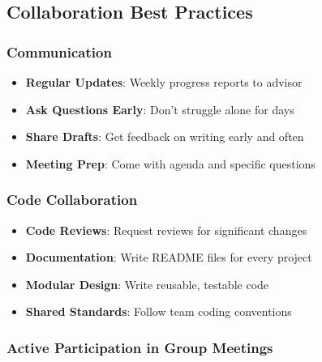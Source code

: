 \documentclass[11pt,a4paper]{article}
\begin{document}
\subsection{Collaboration Best Practices}

\subsubsection{Communication}
\begin{itemize}
    \item \textbf{Regular Updates}: Weekly progress reports to advisor
    \item \textbf{Ask Questions Early}: Don't struggle alone for days
    \item \textbf{Share Drafts}: Get feedback on writing early and often
    \item \textbf{Meeting Prep}: Come with agenda and specific questions
\end{itemize}

\subsubsection{Code Collaboration}
\begin{itemize}
    \item \textbf{Code Reviews}: Request reviews for significant changes
    \item \textbf{Documentation}: Write README files for every project
    \item \textbf{Modular Design}: Write reusable, testable code
    \item \textbf{Shared Standards}: Follow team coding conventions
\end{itemize}

\subsubsection{Active Participation in Group Meetings}
\end{document}
